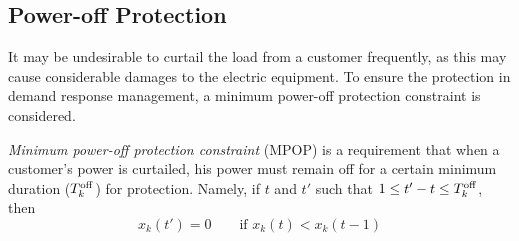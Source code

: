 \vspace{-5pt}
\subsection{Power-off Protection}

It may be undesirable to curtail the load from a customer frequently, as this may cause considerable damages to the electric equipment. To ensure the protection in demand response management, a minimum power-off protection constraint is considered.
\\


\begin{definition}
{\em Minimum power-off protection constraint} ({\sc MPOP}) is a requirement that when a customer's power is curtailed, his power must remain off for a certain minimum duration ($T^{\rm off}_k$) for protection. Namely, if $t$ and $t'$ such that $1 \le t' - t \le  T^{\rm off}_k$, then
\begin{equation}
 x_k(t') = 0 \qquad \mbox{if\ } x_k(t)<x_k(t-1) \label{MPOP}
\end{equation}
\end{definition}

